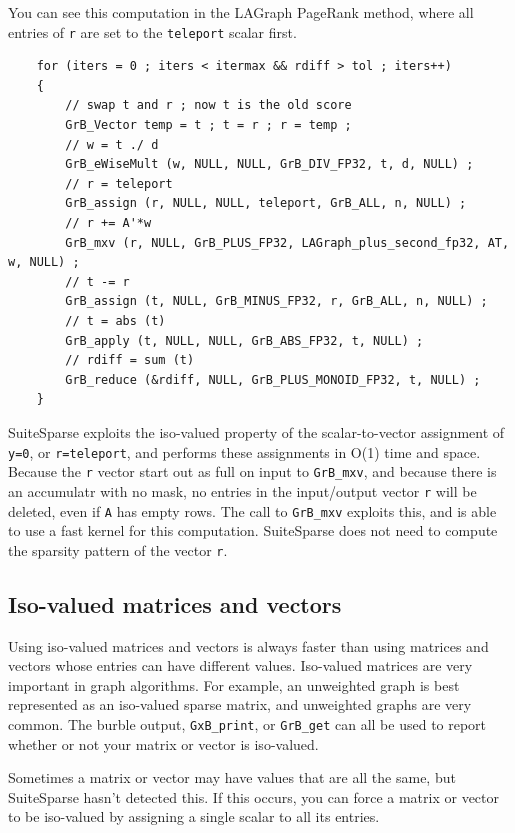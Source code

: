 You can see this computation in the LAGraph PageRank method, where all
entries of \verb'r' are set to the \verb'teleport' scalar first.

    {\footnotesize
    \begin{verbatim}
    for (iters = 0 ; iters < itermax && rdiff > tol ; iters++)
    {
        // swap t and r ; now t is the old score
        GrB_Vector temp = t ; t = r ; r = temp ;
        // w = t ./ d
        GrB_eWiseMult (w, NULL, NULL, GrB_DIV_FP32, t, d, NULL) ;
        // r = teleport
        GrB_assign (r, NULL, NULL, teleport, GrB_ALL, n, NULL) ;
        // r += A'*w
        GrB_mxv (r, NULL, GrB_PLUS_FP32, LAGraph_plus_second_fp32, AT, w, NULL) ;
        // t -= r
        GrB_assign (t, NULL, GrB_MINUS_FP32, r, GrB_ALL, n, NULL) ;
        // t = abs (t)
        GrB_apply (t, NULL, NULL, GrB_ABS_FP32, t, NULL) ;
        // rdiff = sum (t)
        GrB_reduce (&rdiff, NULL, GrB_PLUS_MONOID_FP32, t, NULL) ;
    } \end{verbatim}}

SuiteSparse exploits the iso-valued property of the scalar-to-vector assignment
of \verb'y=0', or \verb'r=teleport', and performs these assignments in O(1)
time and space.  Because the \verb'r' vector start out as full on input to
\verb'GrB_mxv', and because there is an accumulatr with no mask, no entries in
the input/output vector \verb'r' will be deleted, even if \verb'A' has empty
rows.  The call to \verb'GrB_mxv' exploits this, and is able to use a fast
kernel for this computation.  SuiteSparse does not need to compute the sparsity
pattern of the vector \verb'r'.

\subsection{Iso-valued matrices and vectors}

Using iso-valued matrices and vectors is always faster than using matrices and
vectors whose entries can have different values.  Iso-valued matrices are very
important in graph algorithms.  For example, an unweighted graph is best
represented as an iso-valued sparse matrix, and unweighted graphs are very
common.  The burble output, \verb'GxB_print', or \verb'GrB_get'
can all be used to report whether or not your matrix or
vector is iso-valued.

Sometimes a matrix or vector may have values that are all the same, but
SuiteSparse hasn't detected this.  If this occurs, you can force a matrix
or vector to be iso-valued by assigning a single scalar to all its entries.


